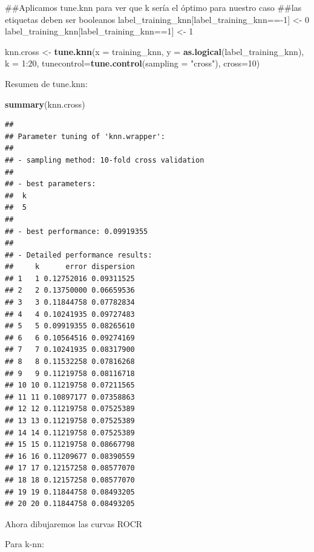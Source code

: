 \documentclass[]{article}
\newenvironment{Shaded}{\begin{snugshade}}{\end{snugshade}}
\newcommand{\KeywordTok}[1]{\textcolor[rgb]{0.13,0.29,0.53}{\textbf{{#1}}}}
\newcommand{\DataTypeTok}[1]{\textcolor[rgb]{0.13,0.29,0.53}{{#1}}}
\newcommand{\DecValTok}[1]{\textcolor[rgb]{0.00,0.00,0.81}{{#1}}}
\newcommand{\StringTok}[1]{\textcolor[rgb]{0.31,0.60,0.02}{{#1}}}
\newcommand{\NormalTok}[1]{{#1}}
\begin{document}
\begin{Shaded}
\begin{Highlighting}[]
\NormalTok{##Aplicamos tune.knn para ver que k sería el óptimo para nuestro caso}
\NormalTok{##las etiquetas deben ser booleanos}
\NormalTok{label_training_knn[label_training_knn==-}\DecValTok{1}\NormalTok{] <-}\StringTok{ }\DecValTok{0}
\NormalTok{label_training_knn[label_training_knn==}\DecValTok{1}\NormalTok{] <-}\StringTok{ }\DecValTok{1}

\NormalTok{knn.cross <-}\StringTok{ }\KeywordTok{tune.knn}\NormalTok{(}\DataTypeTok{x =} \NormalTok{training_knn, }\DataTypeTok{y =} \KeywordTok{as.logical}\NormalTok{(label_training_knn), }\DataTypeTok{k =} \DecValTok{1}\NormalTok{:}\DecValTok{20}\NormalTok{,}
                      \DataTypeTok{tunecontrol=}\KeywordTok{tune.control}\NormalTok{(}\DataTypeTok{sampling =} \StringTok{"cross"}\NormalTok{), }\DataTypeTok{cross=}\DecValTok{10}\NormalTok{)}
\end{Highlighting}
\end{Shaded}

Resumen de tune.knn:

\begin{Shaded}
\begin{Highlighting}[]
\KeywordTok{summary}\NormalTok{(knn.cross)}
\end{Highlighting}
\end{Shaded}

\begin{verbatim}
## 
## Parameter tuning of 'knn.wrapper':
## 
## - sampling method: 10-fold cross validation 
## 
## - best parameters:
##  k
##  5
## 
## - best performance: 0.09919355 
## 
## - Detailed performance results:
##     k      error dispersion
## 1   1 0.12752016 0.09311525
## 2   2 0.13750000 0.06659536
## 3   3 0.11844758 0.07782834
## 4   4 0.10241935 0.09727483
## 5   5 0.09919355 0.08265610
## 6   6 0.10564516 0.09274169
## 7   7 0.10241935 0.08317900
## 8   8 0.11532258 0.07816268
## 9   9 0.11219758 0.08116718
## 10 10 0.11219758 0.07211565
## 11 11 0.10897177 0.07358863
## 12 12 0.11219758 0.07525389
## 13 13 0.11219758 0.07525389
## 14 14 0.11219758 0.07525389
## 15 15 0.11219758 0.08667798
## 16 16 0.11209677 0.08390559
## 17 17 0.12157258 0.08577070
## 18 18 0.12157258 0.08577070
## 19 19 0.11844758 0.08493205
## 20 20 0.11844758 0.08493205
\end{verbatim}

Ahora dibujaremos las curvas ROCR

Para k-nn:
\end{document}
